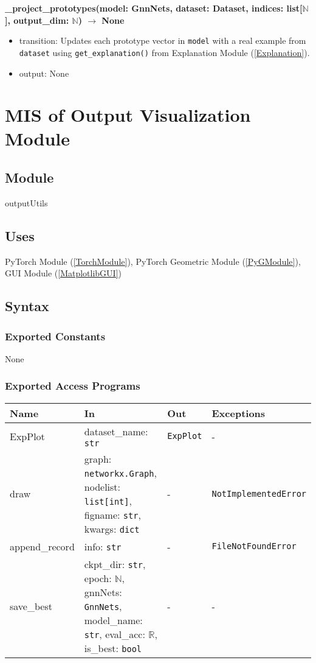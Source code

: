 \documentclass[12pt, titlepage]{article}
\begin{document}
\noindent \textbf{\_project\_prototypes(model: GnnNets, dataset: Dataset, indices: list[\(\mathbb{N}\)], output\_dim: \(\mathbb{N}\)) \(\rightarrow\) None}
\begin{itemize}
  \item transition: Updates each prototype vector in \texttt{model} with a real example from \texttt{dataset} using \texttt{get\_explanation()} from Explanation Module (\ref{Explanation}).
  \item output: None
\end{itemize}





\newpage






\section{MIS of Output Visualization Module} \label{OutputVisualization}

\subsection{Module}
outputUtils

\subsection{Uses}
PyTorch Module (\ref{TorchModule}), PyTorch Geometric Module (\ref{PyGModule}), GUI Module (\ref{MatplotlibGUI})

\subsection{Syntax}

\subsubsection{Exported Constants}
None

\subsubsection{Exported Access Programs}
\begin{center}
\begin{tabular}{p{3.2cm} >{\raggedright\arraybackslash}p{6cm} p{3.5cm} p{3.3cm}}
\hline
\textbf{Name} & \textbf{In} & \textbf{Out} & \textbf{Exceptions} \\
\hline
ExpPlot & dataset\_name: \texttt{str} & \texttt{ExpPlot} & - \\
draw & graph: \texttt{networkx.Graph}, nodelist: \texttt{list[int]}, figname: \texttt{str}, kwargs: \texttt{dict} & - & \texttt{NotImplementedError} \\
append\_record & info: \texttt{str} & - & \texttt{FileNotFoundError} \\
save\_best & ckpt\_dir: \texttt{str}, epoch: \(\mathbb{N}\), gnnNets: \texttt{GnnNets}, model\_name: \texttt{str}, eval\_acc: \(\mathbb{R}\), is\_best: \texttt{bool} & - & - \\
\hline
\end{tabular}
\end{center}
\end{document}
